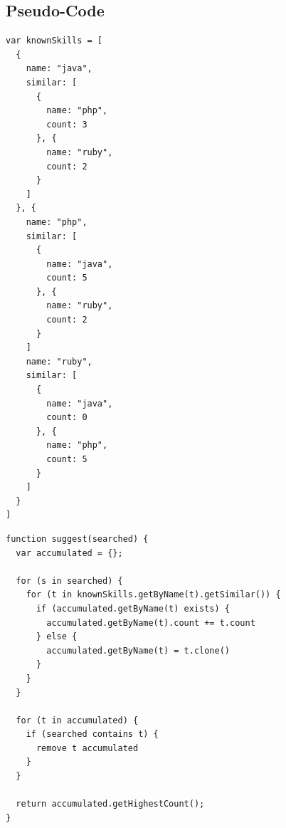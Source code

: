 \subsection{Pseudo-Code}
\begin{lstlisting}[language=JS]
var knownSkills = [
  {
    name: "java",
    similar: [
      {
        name: "php",
        count: 3
      }, {
        name: "ruby",
        count: 2
      }
    ]
  }, {
    name: "php",
    similar: [
      {
        name: "java",
        count: 5
      }, {
        name: "ruby",
        count: 2
      }
    ]
    name: "ruby",
    similar: [
      {
        name: "java",
        count: 0
      }, {
        name: "php",
        count: 5
      }
    ]
  }
]
\end{lstlisting}
\newpage
\begin{lstlisting}[language=JS]
function suggest(searched) {
  var accumulated = {};

  for (s in searched) {
    for (t in knownSkills.getByName(t).getSimilar()) {
      if (accumulated.getByName(t) exists) {
        accumulated.getByName(t).count += t.count
      } else {
        accumulated.getByName(t) = t.clone()
      }
    }
  }

  for (t in accumulated) {
    if (searched contains t) {
      remove t accumulated
    }
  }

  return accumulated.getHighestCount();
}

\end{lstlisting}

